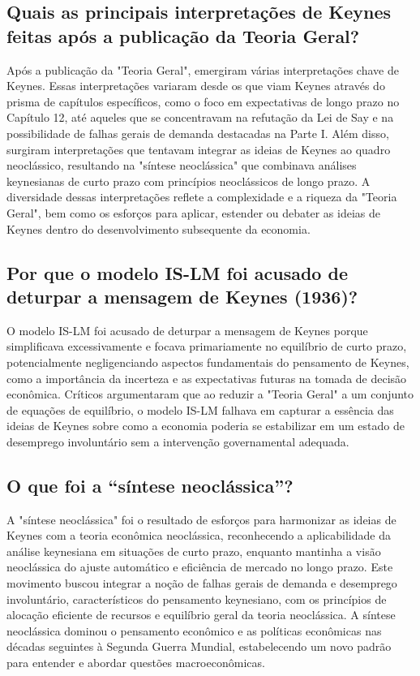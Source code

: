\documentclass[a4paper,12pt]{article}[abntex2]
\begin{document}
\subsection{\textbf{Quais as principais interpretações de Keynes feitas após a publicação da Teoria Geral?}}
Após a publicação da "Teoria Geral", emergiram várias interpretações chave de Keynes. Essas interpretações variaram desde os que viam Keynes através do prisma de capítulos específicos, como o foco em expectativas de longo prazo no Capítulo 12, até aqueles que se concentravam na refutação da Lei de Say e na possibilidade de falhas gerais de demanda destacadas na Parte I. Além disso, surgiram interpretações que tentavam integrar as ideias de Keynes ao quadro neoclássico, resultando na "síntese neoclássica" que combinava análises keynesianas de curto prazo com princípios neoclássicos de longo prazo. A diversidade dessas interpretações reflete a complexidade e a riqueza da "Teoria Geral", bem como os esforços para aplicar, estender ou debater as ideias de Keynes dentro do desenvolvimento subsequente da economia.
\subsection{\textbf{Por que o modelo IS-LM foi acusado de deturpar a mensagem de Keynes (1936)?}}
O modelo IS-LM foi acusado de deturpar a mensagem de Keynes porque simplificava excessivamente e focava primariamente no equilíbrio de curto prazo, potencialmente negligenciando aspectos fundamentais do pensamento de Keynes, como a importância da incerteza e as expectativas futuras na tomada de decisão econômica. Críticos argumentaram que ao reduzir a "Teoria Geral" a um conjunto de equações de equilíbrio, o modelo IS-LM falhava em capturar a essência das ideias de Keynes sobre como a economia poderia se estabilizar em um estado de desemprego involuntário sem a intervenção governamental adequada.
\subsection{\textbf{O que foi a “síntese neoclássica”?}}
A "síntese neoclássica" foi o resultado de esforços para harmonizar as ideias de Keynes com a teoria econômica neoclássica, reconhecendo a aplicabilidade da análise keynesiana em situações de curto prazo, enquanto mantinha a visão neoclássica do ajuste automático e eficiência de mercado no longo prazo. Este movimento buscou integrar a noção de falhas gerais de demanda e desemprego involuntário, característicos do pensamento keynesiano, com os princípios de alocação eficiente de recursos e equilíbrio geral da teoria neoclássica. A síntese neoclássica dominou o pensamento econômico e as políticas econômicas nas décadas seguintes à Segunda Guerra Mundial, estabelecendo um novo padrão para entender e abordar questões macroeconômicas.
\end{document}
